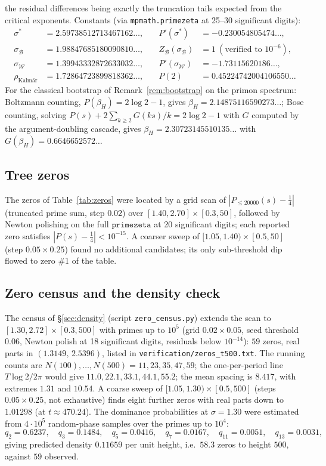 \documentclass[11pt]{article}
\newcommand{\cW}{\mathcal{W}}   %
\newcommand{\cB}{\mathcal{B}}   %
\numberwithin{equation}{section}
\theoremstyle{plain}
\theoremstyle{definition}
\theoremstyle{remark}
\begin{document}
\noindent
the residual differences being exactly the truncation tails expected from the critical
exponents. Constants (via \texttt{mpmath.primezeta} at 25--30 significant digits):
\[
\begin{aligned}
\sigma^{*} &= 2.59738512713467162\dots, &\quad P'(\sigma^{*}) &= -0.230054805474\dots,\\
\sigma_\cB &= 1.98847685180090810\dots, &\quad Z_\cB(\sigma_\cB) &= 1\ (\text{verified to } 10^{-6}),\\
\sigma_\cW &= 1.39943332872633032\dots, &\quad P'(\sigma_\cW) &= -1.73115620186\dots,\\
\rho_{\text{Kalm\'ar}} &= 1.72864723899818362\dots, &\quad P(2) &= 0.45224742004106550\dots
\end{aligned}
\]
For the classical bootstrap of Remark~\ref{rem:bootstrap} on the primon spectrum:
Boltzmann counting, $P(\beta_H) = 2\log2 - 1$, gives
$\beta_H = 2.14875116590273\dots$; Bose counting, solving
$P(s) + 2\sum_{k\ge2} G(ks)/k = 2\log 2 - 1$ with $G$ computed by the
argument-doubling cascade, gives $\beta_H = 2.30723145510135\dots$ with
$G(\beta_H) = 0.6646652572\dots$

\subsection{Tree zeros}

The zeros of Table~\ref{tab:zeros} were located by a grid scan of
$|P_{\le 20000}(s) - \tfrac14|$ (truncated prime sum, step $0.02$) over
$[1.40, 2.70] \times [0.3, 50]$, followed by Newton polishing on the full
$\texttt{primezeta}$ at 20 significant digits; each reported zero satisfies
$|P(s) - \tfrac14| < 10^{-15}$. A coarser sweep of $[1.05, 1.40) \times [0.5, 50]$
(step $0.05 \times 0.25$) found no additional candidates; its only sub-threshold dip
flowed to zero \#1 of the table.

\subsection{Zero census and the density check}

The census of \S\ref{sec:density} (script \texttt{zero\_census.py}) extends the scan
to $[1.30, 2.72] \times [0.3, 500]$ with primes up to $10^5$ (grid
$0.02 \times 0.05$, seed threshold $0.06$, Newton polish at 18 significant digits,
residuals below $10^{-14}$): $59$ zeros, real parts in $(1.3149,\, 2.5396)$, listed
in \texttt{verification/zeros\_t500.txt}. The running counts are
$N(100), \dots, N(500) = 11, 23, 35, 47, 59$; the one-per-period line
$T\log 2/2\pi$ would give $11.0, 22.1, 33.1, 44.1, 55.2$; the mean spacing is
$8.417$, with extremes $1.31$ and $10.54$. A
coarse sweep of $[1.05, 1.30) \times [0.5, 500]$ (steps $0.05 \times 0.25$, not
exhaustive) finds eight further zeros with real parts down to $1.01298$ (at
$t \approx 470.24$). The dominance probabilities at $\sigma = 1.30$ were estimated
from $4 \cdot 10^5$ random-phase samples over the primes up to $10^4$:
\[
q_2 = 0.6237, \quad q_3 = 0.1484, \quad q_5 = 0.0416, \quad q_7 = 0.0167, \quad
q_{11} = 0.0051, \quad q_{13} = 0.0031,
\]
giving predicted density $0.11659$ per unit height, i.e.\ $58.3$ zeros to height
$500$, against $59$ observed.
\end{document}
